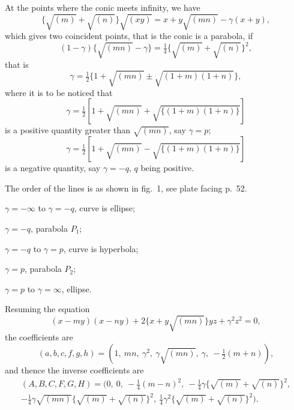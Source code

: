 \documentclass[11pt,a4paper]{article}
\theoremstyle{plain}
\begin{document}
At the points where the conic meets infinity, we have
\begin{equation}
\{\sqrt{(m)} + \sqrt{(n)}\}\sqrt{(xy)} = x + y\sqrt{(mn)} - \gamma(x+y),
\end{equation}
which gives two coincident points, that is the conic is a parabola, if
\begin{equation}
(1-\gamma)\{\sqrt{(mn)} - \gamma\} = \tfrac{1}{4}\{\sqrt{(m)} + \sqrt{(n)}\}^2,
\end{equation}
that is
\begin{equation}
\gamma = \tfrac{1}{2}\{1 + \sqrt{(mn)} \pm \sqrt{(1+m)(1+n)}\},
\end{equation}
where it is to be noticed that
\begin{equation}
\gamma = \tfrac{1}{2}[1 + \sqrt{(mn)} + \sqrt{\{(1+m)(1+n)\}}]
\end{equation}
is a positive quantity greater than $\sqrt{(mn)}$, say $\gamma = p$;
\begin{equation}
\gamma = \tfrac{1}{2}[1 + \sqrt{(mn)} - \sqrt{\{(1+m)(1+n)\}}]
\end{equation}
is a negative quantity, say $\gamma = -q$, $q$ being positive.

The order of the lines is as shown in fig.~1, see plate facing p.~52.

$\gamma = -\infty$ to $\gamma = -q$, curve is ellipse;

$\gamma = -q$, parabola $P_1$;

$\gamma = -q$ to $\gamma = p$, curve is hyperbola;

$\gamma = p$, parabola $P_2$;

$\gamma = p$ to $\gamma = \infty$, ellipse.

\newpage
\setcounter{equation}{8}

Resuming the equation
\begin{equation}
(x-my)(x-ny) + 2\{x + y\sqrt{(mn)}\}yz + \gamma^2 z^2 = 0,
\end{equation}
the coefficients are
\begin{equation}
(a, b, c, f, g, h) = (1,\ mn,\ \gamma^2,\ \gamma\sqrt{(mn)},\ \gamma,\ -\tfrac{1}{2}(m+n)),
\end{equation}
and thence the inverse coefficients are
\begin{multline}
(A, B, C, F, G, H) = (0,\ 0,\ -\tfrac{1}{4}(m-n)^2,\ -\tfrac{1}{4}\gamma\{\sqrt{(m)} + \sqrt{(n)}\}^2, \\
- \tfrac{1}{4}\gamma\sqrt{(mn)}\{\sqrt{(m)} + \sqrt{(n)}\}^2,\ \tfrac{1}{4}\gamma^2\{\sqrt{(m)} + \sqrt{(n)}\}^2).
\end{multline}
\end{document}
